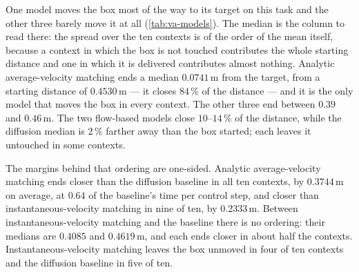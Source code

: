 One model moves the box most of the way to its target on this task and the other three barely move it at all
(\autoref{tab:va-models}). The median is the column to read there: the spread over the ten contexts is
of the order of the mean itself, because a context in which the box is not touched contributes the whole
starting distance and one in which it is delivered contributes almost nothing. Analytic average-velocity matching ends a median $0.0741$\,m from the target,
from a starting distance of $0.4530$\,m --- it closes $84\,\%$ of the distance --- and it is the only model
that moves the box in every context. The other three end between $0.39$ and $0.46$\,m. The two
flow-based models close $10$--$14\,\%$ of the distance, while the diffusion median is $2\,\%$ farther
away than the box started; each leaves it untouched in some contexts.

The margins behind that ordering are one-sided. Analytic average-velocity matching ends closer than the
diffusion baseline in all ten contexts, by $0.3744$\,m on average, at $0.64$ of the baseline's time per
control step, and closer than instantaneous-velocity matching in nine of ten, by $0.2333$\,m. Between
instantaneous-velocity matching and the baseline there is no ordering: their medians are $0.4085$ and
$0.4619$\,m, and each ends closer in about half the contexts. Instantaneous-velocity matching leaves the
box unmoved in four of ten contexts and the diffusion baseline in five of ten.

